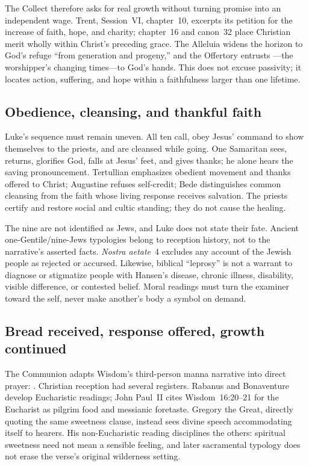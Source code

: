 The Collect therefore asks for real growth without turning promise into an
independent wage. Trent, Session~VI, chapter~10, excerpts its petition for the
increase of faith, hope, and charity; chapter~16 and canon~32 place Christian
merit wholly within Christ's preceding grace. The Alleluia widens the horizon
to God's refuge ``from generation and progeny,'' and the Offertory entrusts
---the worshipper's changing times---to God's hands. This
does not excuse passivity; it locates action, suffering, and hope within a
faithfulness larger than one lifetime.

\subsection*{Obedience, cleansing, and thankful faith}

Luke's sequence must remain uneven. All ten call, obey Jesus' command to show
themselves to the priests, and are cleansed while going. One Samaritan sees,
returns, glorifies God, falls at Jesus' feet, and gives thanks; he alone hears
the saving pronouncement. Tertullian emphasizes obedient movement and thanks
offered to Christ; Augustine refuses self-credit; Bede distinguishes common
cleansing from the faith whose living response receives salvation. The
priests certify and restore social and cultic standing; they do not cause the
healing.

The nine are not identified as Jews, and Luke does not state their fate.
Ancient one-Gentile/nine-Jews typologies belong to reception history, not to
the narrative's asserted facts. \emph{Nostra aetate}~4 excludes any account of
the Jewish people as rejected or accursed. Likewise, biblical ``leprosy'' is
not a warrant to diagnose or stigmatize people with Hansen's disease, chronic
illness, disability, visible difference, or contested belief. Moral readings
must turn the examiner toward the self, never make another's body a symbol on
demand.

\subsection*{Bread received, response offered, growth continued}

The Communion adapts Wisdom's third-person manna narrative into direct prayer:
. Christian reception had several
registers. Rabanus and Bonaventure develop Eucharistic readings; John
Paul~II cites Wisdom~16:20--21 for the Eucharist as pilgrim food and messianic
foretaste. Gregory the Great, directly quoting the same sweetness clause,
instead sees divine speech accommodating itself to hearers. His
non-Eucharistic reading disciplines the others: spiritual sweetness need not
mean a sensible feeling, and later sacramental typology does not erase the
verse's original wilderness setting.


